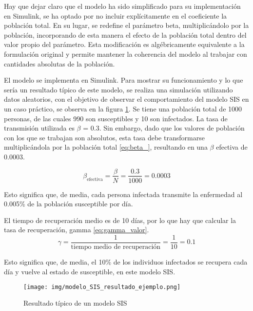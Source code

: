 Hay que dejar claro que el modelo ha sido simplificado para su implementación en Simulink, se ha optado por no incluir explícitamente en el coeficiente la población total. En su lugar, se redefine el parámetro beta, multiplicándolo por la población, incorporando de esta manera el efecto de la población total dentro del valor propio del parámetro. Esta modificación es algébricamente equivalente a la formulación original y permite mantener la coherencia del modelo al trabajar con cantidades absolutas de la población. 

El modelo se implementa en Simulink. Para mostrar su funcionamiento y lo que sería un resultado típico de este modelo, se realiza una simulación utilizando datos aleatorios, con el objetivo de observar el comportamiento del modelo SIS en un caso práctico, se observa en la figura \ref{fig:ejeSIS}. Se tiene una población total de 1000 personas, de las cuales 990 son susceptibles y 10 son infectados. La tasa de transmisión utilizada es $\beta$ = 0.3. Sin embargo, dado que los valores de población con los que se trabajan son absolutos, esta tasa debe transformarse multiplicándola por la población total \ref{eq:beta_}, resultando en una $\beta$ efectiva de 0.0003.

\begin{equation}
\beta_{\text{efectiva}} = \frac{\beta}{N} = \frac{0.3}{1000} = 0.0003
\label{eq:beta_}
\end{equation}

Esto significa que, de media, cada persona infectada transmite la enfermedad al 0.005\% de la población susceptible por día.

El tiempo de recuperación medio es de 10 días, por lo que hay que calcular la tasa de recuperación, gamma \eqref{eq:gamma_valor}.
\begin{equation}
\gamma = \frac{1}{\text{tiempo medio de recuperación}} = \frac{1}{10} = 0.1
\label{eq:gamma_valor}
\end{equation}

Esto significa que, de media, el 10\% de los individuos infectados se recupera cada día y vuelve al estado de susceptible, en este modelo SIS.


\begin{figure}[H]
    \centering
    \texttt{[image: img/modelo\_SIS\_resultado\_ejemplo.png]}
    \caption{Resultado típico de un modelo SIS}
    \label{fig:ejeSIS}
    \vspace{0.5cm} %
\end{figure}

